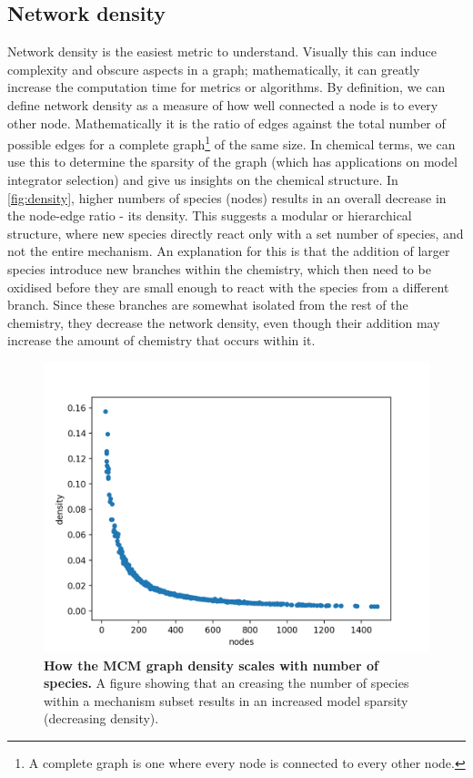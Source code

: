 \subsection{Network density}\label{sec:netdensity}
Network density is the easiest metric to understand. Visually this can induce complexity and obscure aspects in a graph; mathematically, it can greatly increase the computation time for metrics or algorithms. By definition, we can define network density as a measure of how well connected a node is to every other node. Mathematically it is the ratio of edges against the total number of possible edges for a complete graph\footnote{A complete graph is one where every node is connected to every other node.} of the same size. In chemical terms, we can use this to determine the sparsity of the graph (which has applications on model integrator selection) and give us insights on the chemical structure.  In \autoref{fig:density}, higher numbers of species (nodes) results in an overall decrease in the node-edge ratio - its density. This suggests a modular or hierarchical structure, where new species directly react only with a set number of species, and not the entire mechanism. An explanation for this is that the addition of larger species introduce new branches within the chemistry, which then need to be oxidised before they are small enough to react with the species from a different branch.  Since these branches are somewhat isolated from the rest of the chemistry, they decrease the network density, even though their addition may increase the amount of chemistry that occurs within it.

\begin{figure}[H]
     \centering
         \includegraphics[width=.7\textwidth]{figures_c3/sparcity.png}
        \caption{\textbf{How the MCM graph density scales with number of species.} A figure showing that an creasing the number of species within a mechanism subset results in an increased model sparsity (decreasing density).}
        \label{fig:density}
\end{figure}

